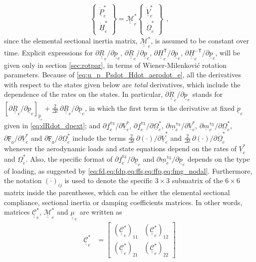 \documentclass[12pt,a4paper,oneside,english]{abntex2} %
\newcommand{\fix}[1]{{\color{red}#1}}
\newcommand{\vect}[1]{\underline{#1}}
\def\tens#1{\underline{\underline{#1}}}
\def\lb{\left[}
\def\rb{\right]}
\def\lp{\left(}
\def\rp{\right)}
\def\T{\mathsf{T}}
\def\R{\tens{R}}
\def\V{\vect{V}}
\def\Vs{\V^{*}}
\def\Om{\vect{\Omega}}
\def\Oms{\Om^{*}}
\def\P{\vect{P}}
\def\Hv{\vect{H}}
\def\H{\tens{H}}
\def\p{\vect{p}}
\def\pdot{\dot{\p}}
\def\f{\vect{f}}
\def\m{\vect{m}}
\def\pe{\p_e}
\def\pdote{\pdot_e}
\def\Vse{\Vs_e}
\def\Vsdote{\dot{\V}_e^*}
\def\Omse{\Oms_e}
\def\Omsdote{\dot{\Om}_e^*}
\def\Pdotse{\dot{\P}_e^*}
\def\Hdotse{\dot{\Hv}_e^*}
\def\HTe{\H^\T_e}
\def\HinvTe{\H^{-\T}_e}
\def\fe{\f_e}
\def\me{\m_e}
\def\Re{\R_{e}}
\def\Rdote{\dot{\R}_e}
\def\Compliance{\mathcal{\tens{C}}^*}
\def\Compliancee{\Compliance_e}
\def\Mass{\mathcal{\tens{M}}^*}
\def\Masse{\Mass_e}
\def\dt{\Delta t}
\def\todt{\frac{2}{\dt}}
\def\Fa{\mathtt{\vect{F}}_{a}}
\def\dt{\Delta t}
\begin{document}
\begin{apendicesenv}
\begin{align}
    \begin{Bmatrix}
    \Pdotse \\ \Hdotse
    \end{Bmatrix}
    = \Masse
    \begin{Bmatrix}
    \Vsdote \\ \Omsdote
    \end{Bmatrix} \ \ ,
    \label{eq:mom_vel_rates}
\end{align}
since the elemental sectional inertia matrix, $\Masse$, is assumed to be constant over time. Explicit expressions for $\partial\Re/\partial\pe$, $\partial\Rdote/\partial\pe$, $\partial\HTe/\partial\pe$, $\partial\HinvTe/\partial\pe$, will be given only in section \ref{sec:rotpar}, in terms of Wiener-Milenkovi\'{c} rotation parameters. \fix{Because of \cref{eq:u_p_Psdot_Hdot_aerodot_e}, all the derivatives with respect to the states given below are \emph{total} derivatives, which include the dependence of the rates on the states. In particular, $\partial\Rdote/\partial\pe$ stands for $\lb\partial\Rdote/\partial\pe\rb_{\pdote}+\todt\,\partial\Re/\partial\pe$, in which the first term is the derivative at fixed $\pdote$ given in \cref{eq:dRdot_dpext}; and $\partial\fe^\leftrightarrows/\partial\Vse$, $\partial\fe^\leftrightarrows/\partial\Omse$, $\partial\me^\leftrightarrows/\partial\Vse$, $\partial\me^\leftrightarrows/\partial\Omse$, $\partial\Fa/\partial\Vse$ and $\partial\Fa/\partial\Omse$ include the terms $\todt\,\partial(\cdot)/\partial\Vsdote$ and $\todt\,\partial(\cdot)/\partial\Omsdote$ whenever the aerodynamic loads and state equations depend on the rates of $\Vse$ and $\Omse$.} Also, the specific format of $\partial\fe^\leftrightarrows/\partial\pe$ and $\partial\me^\leftrightarrows/\partial\pe$ depends on the type of loading, as suggested by \cref{eq:fd,eq:fdp,eq:ffs,eq:ffp,eq:fmg_nodal}. Furthermore, the notation $\lp\cdot\rp_{ij}$ is used to denote the specific $3 \times 3$ submatrix of the $6 \times 6$ matrix inside the parentheses, which can be either the elemental sectional compliance, sectional inertia \fix{or damping coefficients} matrices. In other words, matrices $\Compliancee$, $\Masse$ and $\tens{\mu}_e$ are written as
\fix{
\begin{equation}
\begin{aligned}
    \Compliancee &= 
    \begin{bmatrix}
    \lp\Compliancee\rp_{11} & \lp\Compliancee\rp_{12}
    \\ 
    \lp\Compliancee\rp_{21} & \lp\Compliancee\rp_{22}

\end{bmatrix}
\end{aligned}
\end{equation}}
\end{apendicesenv}
\end{document}
